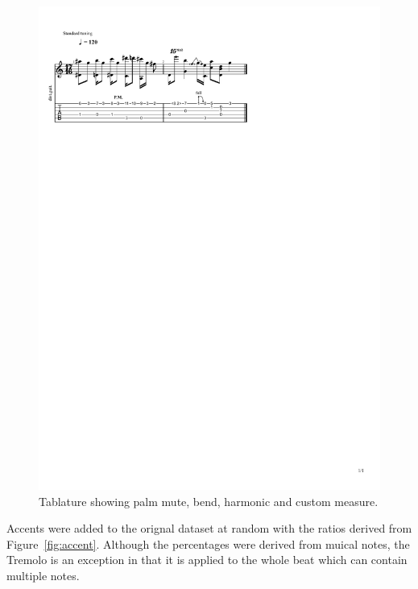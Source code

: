 \documentclass[twoside,11pt]{article}
\begin{document}
\begin{figure}[H]
\centering
\includegraphics[trim={20 620 200 100}, clip, width=0.6\linewidth]{outputexample.pdf}
\caption{Tablature showing palm mute, bend, harmonic and custom measure.}
\label{fig:gpro}
\end{figure}

Accents were added to the orignal dataset at random with the ratios derived from Figure~\ref{fig:accent}.
Although the percentages were derived from muical notes, the Tremolo is an exception in that it is applied 
to the whole beat which can contain multiple notes.


\vskip 0.2in

\end{document}
